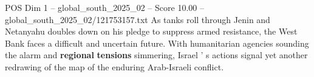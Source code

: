 \begin{textsample}{POS Dim 1 – global\_south\_2025\_02 – Score 10.00 – global\_south\_2025\_02/121753157.txt}
As tanks roll through Jenin and Netanyahu doubles down on his pledge to suppress armed resistance, the West Bank faces a difficult and uncertain future.
With humanitarian agencies sounding the alarm and \textbf{regional} \textbf{tensions} simmering, Israel ' s actions signal yet another redrawing of the map of the enduring Arab-Israeli conflict.

\end{textsample}
